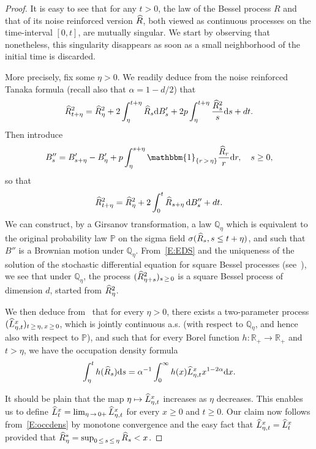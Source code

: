 \documentclass[AHL,Unicode,longabstracts,published]{cedram}
\newcommand{\ind}[1]{\mathbbm{1}_{\left\{#1\right\}}}
\renewcommand{\hat}[1]{\widehat{#1}}
\newcommand{\dd}{\mathrm{d}}
\newcommand{\Q}{\mathbb{Q}}
\renewcommand{\P}{\mathbb{P}}
\newcommand{\R}{\mathbb{R}}
\let\oldhat\hat
\renewcommand*{\hat}[1]{\mathchoice{\widehat{#1}}{\widehat{#1}}{\oldhat{#1}}{\oldhat{#1}}}
\begin{document}
\begin{proof}
It is easy to see that for any $t>0$, the law of the Bessel process $R$ and that of its noise reinforced version $\hat R$, both viewed as continuous processes on the time-interval $[0,t]$, are mutually singular. We start by observing that nonetheless, this singularity disappears as soon as a small neighborhood of the initial time is discarded.

More precisely, fix some $\eta>0$. We readily deduce from the noise reinforced Tanaka formula (recall also that $\alpha=1-d/2$) that
\[
\hat R_{t+\eta}^2= \hat R^2_{\eta} + 2\int_{\eta}^{t+\eta} \hat R_s \dd B'_s + 2p \int_{\eta}^{t+\eta} \frac{\hat R^2_s}{s} \dd s + dt.
\]
Then introduce
\[
B''_s= B'_{s+\eta} - B'_{\eta} + p\int_{\eta}^{s+\eta} \ind{r\,>\,\eta} \frac{\hat R_r}{r} \dd r,\quad s\geq 0,
\]
so that
\begin{equation}\label{E:EDS}
\hat R_{t+\eta}^2= \hat R^2_{\eta} + 2\int_{0}^t \hat R_{s+\eta}\, \dd B''_s + d t.
\end{equation}
We can construct, by a Girsanov transformation, a law $\Q_{\eta}$ which is equivalent to the original probability law $\P$ on the sigma field $\sigma(\hat R_s, s\leq t+\eta)$, and such that $B''$ is a Brownian motion under $\Q_{\eta}$. From~\eqref{E:EDS} and the uniqueness of the solution of the stochastic differential equation for square Bessel processes (see~\cite[Section~XI.1]{RY}), we see that under $\Q_{\eta}$, the process $(\hat R_{\eta+s}^2)_{s\,\geq\,0}$ is a square Bessel process of dimension $d$, started from $\hat R_{\eta}^2$.

We then deduce from~\cite[Proposition~3.1]{DRVY} that for every $\eta>0$, there exists a two-parameter process $(\hat{L}^x_{\eta,t})_{t\,\geq\,\eta,\,x\,\geq\,0}$, which is jointly continuous a.s. (with respect to $\Q_{\eta}$, and hence also with respect to $\P$), and such that for every Borel function $h: \R_+\to \R_+$ and $t>\eta$, we have the occupation density formula
\begin{equation}\label{E:occdens}
\int_{\eta}^t h(\hat R_s) \dd s = \alpha^{-1} \int_0^{\infty} h(x) \hat{L}^x_{\eta,t} x^{1-2\alpha} \dd x.
\end{equation}

It should be plain that the map $\eta\mapsto \hat{L}^x_{\eta,t}$ increases as $\eta$ decreases. This enables us to define $ \hat{L}^x_{t} = \lim_{\eta\,\to\,0+} \hat{L}^x_{\eta,t}$ for every $x\geq 0$ and $t\geq 0$. Our claim now follows from~\eqref{E:occdens} by monotone convergence and the easy fact that $\hat{L}^x_{\eta,t}=\hat{L}^x_{t}$ provided that $\hat R^*_{\eta}=\sup_{0\,\leq\,s\,\leq\,\eta} \hat R_s <x$.
\end{proof}
\end{document}
